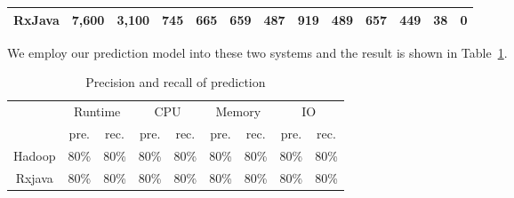 \begin{table*}[tbh]
\begin{tabular}{|c|r|r|c|r|c|r|c|r|c|r|c|r|}
		RxJava            & 7,600                                                                           & 3,100                                                                  & \multicolumn{1}{r|}{745}                                & 665                                                                           & \multicolumn{1}{r|}{659}                                & 487                                                                           & \multicolumn{1}{r|}{919}                                & 489                                                                           & \multicolumn{1}{r|}{657}                                & 449                                                                           & \multicolumn{1}{r|}{38}                                 & 0                                                                             \\ \hline
	\end{tabular}
\end{table*}

We employ our prediction model into these two systems and the result is shown in Table~\ref{tab:logistic}.

\begin{table}[]
	\centering
	\footnotesize
	\caption{Precision and recall of prediction}
	\label{tab:logistic}
\begin{tabular}{|c|c|r|c|r|c|r|c|r|}
	\hline
	\multirow{2}{*}{} & \multicolumn{2}{c|}{Runtime}                          & \multicolumn{2}{c|}{CPU}                              & \multicolumn{2}{c|}{Memory}                           & \multicolumn{2}{c|}{IO}                               \\ \cline{2-9} 
	& pre.                      & \multicolumn{1}{c|}{rec.} & pre.                      & \multicolumn{1}{c|}{rec.} & pre.                      & \multicolumn{1}{c|}{rec.} & pre.                      & \multicolumn{1}{c|}{rec.} \\ \hline
	Hadoop            & \multicolumn{1}{r|}{80\%} & 80\%                      & \multicolumn{1}{r|}{80\%} & 80\%                      & \multicolumn{1}{r|}{80\%} & 80\%                      & \multicolumn{1}{r|}{80\%} & 80\%                      \\ \hline
	Rxjava            & \multicolumn{1}{r|}{80\%} & 80\%                      & \multicolumn{1}{r|}{80\%} & 80\%                      & \multicolumn{1}{r|}{80\%} & 80\%                      & \multicolumn{1}{r|}{80\%} & 80\%                      \\ \hline
\end{tabular}
\end{table}

